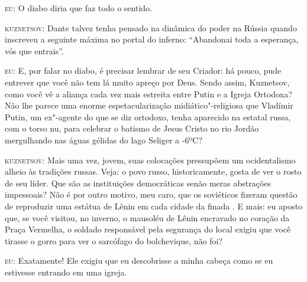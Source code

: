 \textsc{eu:} O diabo diria que faz todo o sentido.

\textsc{kuznetsov:} Dante talvez tenha pensado na dinâmica do poder na
Rússia quando inscreveu a seguinte máxima no portal do inferno:
``Abandonai toda a esperança, vós que entrais''.

\textsc{eu:} E, por falar no diabo, é precisar lembrar de seu Criador:
há pouco, pude entrever que você não tem lá muito apreço por Deus. Sendo
assim, Kuznetsov, como você vê a aliança cada vez mais estreita entre
Putin e a Igreja Ortodoxa? Não lhe parece uma enorme espetacularização
midiático"-religiosa que Vladímir Putin, um ex"-agente do  que se diz
ortodoxo, tenha aparecido na  estatal russa, com o torso nu, para
celebrar o batismo de Jesus Cristo no rio Jordão mergulhando nas águas
gélidas do lago Seliger a -6ºC?

\textsc{kuznetsov:} Mais uma vez, jovem, suas colocações pressupõem um
ocidentalismo alheio às tradições russas. Veja: o povo russo,
historicamente, gosta de ver o rosto de seu líder. Que são as
instituições democráticas senão meras abstrações impessoais? Não é por
outro motivo, meu caro, que os soviéticos fizeram questão de reproduzir
uma estátua de Lênin em cada cidade da finada . E mais: eu aposto
que, se você visitou, no inverno, o mausoléu de Lênin encravado no
coração da Praça Vermelha, o soldado responsável pela segurança do local
exigiu que você tirasse o gorro para ver o sarcófago do bolchevique, não
foi?

\textsc{eu:} Exatamente! Ele exigiu que eu descobrisse a minha cabeça
como se eu estivesse entrando em uma igreja.

